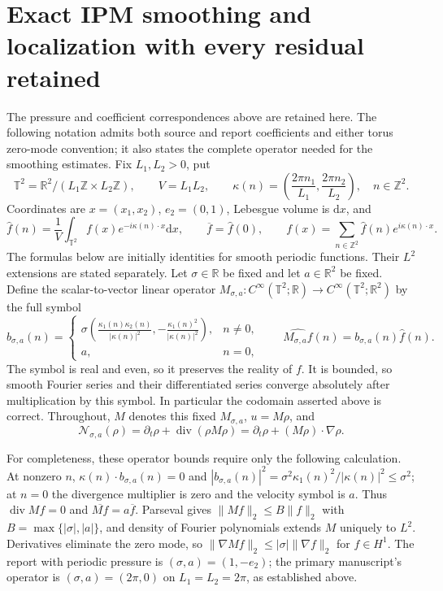 \begingroup
\def\T{\mathbb T^2}
\def\R{\mathbb R}
\def\Z{\mathbb Z}
\def\av#1{\overline{#1}}
\def\dd{\mathrm d}
\def\diver{\operatorname{div}}
\def\supp{\operatorname{supp}}
\def\calN{\mathcal N}
\section{Exact IPM smoothing and localization with every residual retained}
The pressure and coefficient correspondences above are retained here.
The following notation admits both source and report coefficients and either
torus zero-mode convention; it also states the complete operator needed for
the smoothing estimates.
Fix $L_1,L_2>0$, put
\[
\T=\R^2/(L_1\Z\times L_2\Z),\qquad V=L_1L_2,\qquad
\kappa(n)=\left(\frac{2\pi n_1}{L_1},\frac{2\pi n_2}{L_2}\right),\quad n\in\Z^2.
\]
Coordinates are $x=(x_1,x_2)$, $e_2=(0,1)$, Lebesgue volume is $\dd x$, and
\[
\widehat f(n)=\frac1V\int_{\T}f(x)e^{-i\kappa(n)\cdot x}\dd x,
\qquad \av f=\widehat f(0),\qquad
f(x)=\sum_{n\in\Z^2}\widehat f(n)e^{i\kappa(n)\cdot x}.
\]
The formulas below are initially identities for smooth periodic functions.
Their $L^2$ extensions are stated separately. Let $\sigma\in\R$ be fixed and
let $a\in\R^2$ be fixed. Define the scalar-to-vector linear operator
$M_{\sigma,a}:C^\infty(\T;\R)\to C^\infty(\T;\R^2)$ by the full symbol
\begin{equation}\label{ipmc:symbol}
b_{\sigma,a}(n)=
\begin{cases}
\displaystyle\sigma\left(\frac{\kappa_1(n)\kappa_2(n)}{|\kappa(n)|^2},
-\frac{\kappa_1(n)^2}{|\kappa(n)|^2}\right),&n\ne0,\\
a,&n=0,
\end{cases}
\qquad \widehat{M_{\sigma,a}f}(n)=b_{\sigma,a}(n)\widehat f(n).
\end{equation}
The symbol is real and even, so it preserves the reality of $f$.
It is bounded, so smooth Fourier series and their differentiated series
converge absolutely after multiplication by this symbol. In particular the
codomain asserted above is correct. Throughout, $M$ denotes this fixed
$M_{\sigma,a}$, $u=M\rho$, and
\begin{equation}\label{ipmc:N}
\calN_{\sigma,a}(\rho)=\partial_t\rho+\diver(\rho M\rho)
=\partial_t\rho+(M\rho)\cdot\nabla\rho.
\end{equation}


For completeness, these operator bounds require only the following calculation.
At nonzero $n$, $\kappa(n)\cdot b_{\sigma,a}(n)=0$ and
$|b_{\sigma,a}(n)|^2=\sigma^2\kappa_1(n)^2/|\kappa(n)|^2\le\sigma^2$;
at $n=0$ the divergence multiplier is zero and the velocity symbol is $a$.
Thus $\diver Mf=0$ and $\overline{Mf}=a\overline f$.
Parseval gives
$\|Mf\|_2\le B\|f\|_2$ with $B=\max\{|\sigma|,|a|\}$,
and density of Fourier polynomials extends $M$ uniquely to $L^2$.
Derivatives eliminate the zero mode, so
$\|\nabla Mf\|_2\le|\sigma|\|\nabla f\|_2$ for $f\in H^1$.
The report with periodic pressure is $(\sigma,a)=(1,-e_2)$;
the primary manuscript's operator is $(\sigma,a)=(2\pi,0)$
on $L_1=L_2=2\pi$, as established above.
